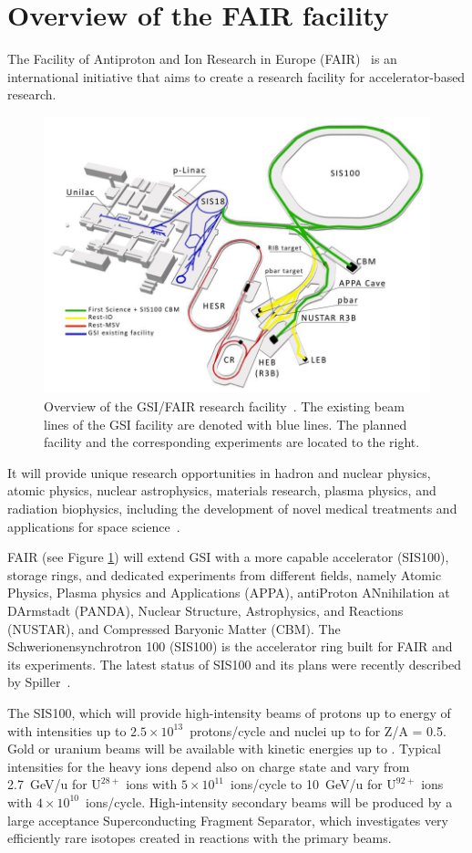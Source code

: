 \section{Overview of the FAIR facility}
The Facility of Antiproton and Ion Research in Europe (\gls{FAIR})~\cite{fair} is an international initiative that aims to create a research facility for accelerator-based research. 

\begin{figure}[!h]
    \centering
    \includegraphics[width=0.85\columnwidth]{Chapter1/images/fair2.png}
    \caption{Overview of the GSI/FAIR research facility~\cite{fair}. The existing beam lines of the \gls{GSI} facility are denoted with blue lines. The planned facility and the corresponding experiments are located to the right.}
    \label{fig:fair}
\end{figure}

It will provide unique research opportunities in hadron and nuclear physics, atomic physics, nuclear astrophysics, materials research, plasma physics, and radiation biophysics, including the development of novel medical treatments and applications for space science~\cite{fair1}. 
 
FAIR (see Figure \ref{fig:fair}) will extend GSI with a more capable accelerator (SIS100), storage rings, and dedicated experiments from different fields, namely Atomic Physics, Plasma physics and Applications (APPA), antiProton ANnihilation at DArmstadt (PANDA), Nuclear Structure, Astrophysics, and Reactions (NUSTAR), and Compressed Baryonic Matter (\gls{CBM}). The Schwerionensynchrotron 100 (SIS100) is
the accelerator ring built for FAIR and its experiments. The latest status of SIS100 and its plans were recently described by Spiller~\cite{Spiller_2020}.

The SIS100, which will provide high-intensity beams of protons up
to energy of   with intensities up to $2.5\times 10^{13}$~protons/cycle and nuclei up to  for Z/A = 0.5. Gold or uranium beams will be available with kinetic energies up to . Typical intensities for the heavy ions depend also on charge state and vary from 2.7~GeV/u for $\mathrm{U^{28+}}$ ions with $5\times 10^{11}$~ions/cycle to 10~GeV/u for $\mathrm{U^{92+}}$ ions with $4\times 10^{10}$~ions/cycle. High-intensity secondary beams will be produced by a large acceptance Superconducting Fragment Separator, which investigates very efficiently rare isotopes created in reactions with the primary beams. 